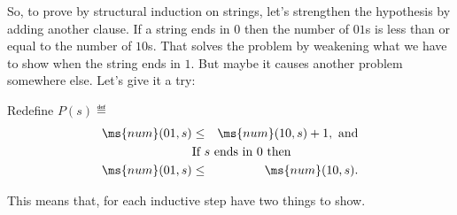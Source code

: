 \begin{definition}
\begin{editingnotes}
So, to prove by structural induction on strings, let's strengthen the
hypothesis by adding another clause.  If a string ends in $0$ then
the number of $01$s is less than or equal to the number of $10$s.
That solves the problem by weakening what we have to show when the
string ends in $1$.  But maybe it causes another problem somewhere
else.  Let's give it a try:

Redefine $P(s) \eqdef$
\begin{eqnarray*}
\ms{num}(01,s) & \leq & \ms{num}(10,s) + 1, \text{ and}\\
\lefteqn{\text{If $s$ ends in $0$ then}}\\
\ms{num}(01,s) & \leq  &\ms{num}(10,s).
\end{eqnarray*} 
 
This means that, for each inductive step have two things to show.
\iffalse

\structuredproof{

  Prove: $\forall s \in S \; (P(s))$ \\
  1. (Base) $P(\emptystring)$ 
  \reason{No patterns of either kind.} \\
  2. (Inductive step) $\forall s \in S \; (P(s) \implies P(s 0))$ \\
  1. Fix $s$. \\
  2. Assume $P(s)$. \\
  3. $P(s 0)$ \\
  1. $\ms{num}(01,s0) \leq \ms{num}(10,s0) + 1$. 
  \reason{???} \\
  2. If $s 0$ ends in $0$ then $\ms{num}(01,s0) \leq
  \ms{num}(10,s0)$. \noreason \\
  \reason{???} \\
  3. QED
  \reason{Conjunction} \\
  4. QED 
  \reason{Implication, UG} \\
  3. (Inductive step) $\forall s \in S \; (P(s) \implies P(s 1))$ \\
  1. Fix $s$. \\
  2. Assume $P(s)$. \\
  3. $P(s 1)$ \\
  1. $\ms{num}(01,s1) \leq \ms{num}(10,s1) + 1$. 
  \reason{???} \\
  2. If $s 1$ ends in $0$ then $\ms{num}(01,s1) \leq
  \ms{num}(10,s1)$.\noreason \\
  \reason{???} \\
  3. QED
  \reason{Conjunction} \\
  4. QED 
  \reason{Implication, UG} \\
  4. QED
  \reason{Structural induction on strings.}\\
}\fi


\end{editingnotes}
\end{definition}

